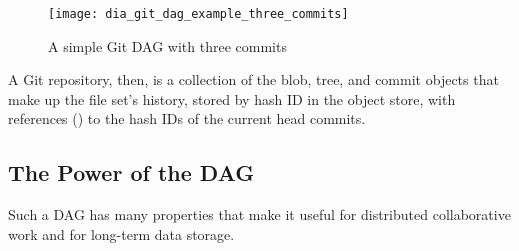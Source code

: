 \begin{figure}[h]
    \centering
    \texttt{[image: dia\_git\_dag\_example\_three\_commits]}
    \caption{A simple Git DAG with three commits}
    \label{dia_git_dag_example_three_commits}
\end{figure}

A Git repository, then, is a collection of the \gls{blob}, \gls{tree}, and
\gls{commit} objects that make up the file set's history, stored by hash ID in
the object store, with references () to the hash IDs of the
current head \glspl{commit}\cite{git_initial_readme}.

%

\subsection{The Power of the DAG}

Such a \gls{DAG} has many properties that make it useful for distributed
collaborative work and for long-term data storage.

